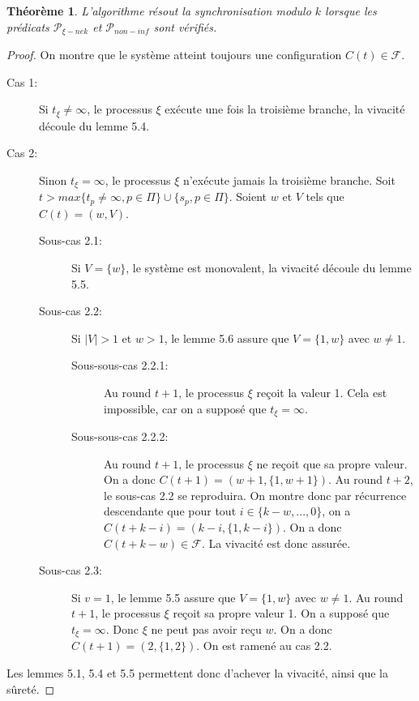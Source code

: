 \documentclass{article}
\newtheorem{theorem}{Théorème}
\begin{document}
\begin{theorem}
	L'algorithme résout la synchronisation modulo $k$ lorsque les prédicats $\mathcal{P}_{\xi-nek}$ et $\mathcal{P}_{non-inf}$ sont vérifiés.
\end{theorem}
\begin{proof}

	On montre que le système atteint toujours une configuration $C(t) \in \mathcal{F}$.

	\begin{description}
		\item[Cas 1:] Si $t_\xi \neq \infty$, le processus $\xi$ exécute une fois la troisième branche, la vivacité découle du lemme 5.4.
		\item[Cas 2:] Sinon $t_\xi = \infty$, le processus $\xi$ n'exécute jamais la troisième branche.
			Soit $t > max \{t_p \neq \infty, p \in \Pi\} \cup \{s_p, p \in \Pi\}$. Soient $w$ et $V$ tels que $C(t) = (w, V)$.
			\begin{description}
				\item[Sous-cas 2.1:] Si $V = \{w\}$, le système est monovalent, la vivacité découle du lemme 5.5.
				\item[Sous-cas 2.2:] Si $|V| > 1$ et $w > 1$, le lemme 5.6 assure que $V = \{1, w\}$ avec $w \neq 1$.
					\begin{description}
						\item[Sous-sous-cas 2.2.1:] Au round $t+1$, le processus $\xi$ reçoit la valeur 1. Cela est impossible, car on a supposé que $t_\xi = \infty$.
						\item[Sous-sous-cas 2.2.2:] Au round $t+1$, le processus $\xi$ ne reçoit que sa propre valeur. 
							On a donc $C(t+1) = (w+1, \{1, w+1\})$. Au round $t+2$, le sous-cas 2.2 se reproduira.
							On montre donc par récurrence descendante que pour tout $i \in \{k-w, ..., 0\}$,
							on a $C(t+k-i) = (k-i, \{1, k-i\})$. On a donc $C(t+k-w) \in \mathcal{F}$. La vivacité est donc assurée.
					\end{description}
				\item[Sous-cas 2.3:] Si $v = 1$, le lemme 5.5 assure que $V = \{1, w\}$ avec $w \neq 1$.
					Au round $t+1$, le processus $\xi$ reçoit sa propre valeur 1. On a supposé que $t_\xi = \infty$. Donc $\xi$ ne peut pas avoir reçu $w$.
					On a donc $C(t+1) = (2, \{1, 2\})$. On est ramené au cas 2.2.
			\end{description}
	\end{description}

	Les lemmes 5.1, 5.4 et 5.5 permettent donc d'achever la vivacité, ainsi que la sûreté.
\end{proof}
\end{document}
